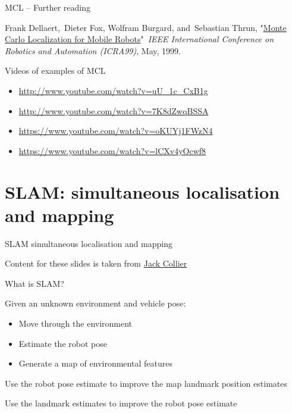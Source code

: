 \documentclass[compress]{beamer}
\begin{document}
\begin{frame}{MCL -- Further reading}

Frank Dellaert,~Dieter Fox, Wolfram Burgard, and~Sebastian Thrun,
"\href{http://www.ri.cmu.edu/publication_view.html?pub_id=533}{Monte
Carlo Localization for Mobile Robots}"~\emph{IEEE International
Conference on Robotics and Automation (ICRA99)}, May, 1999.

Videos of examples of MCL

\begin{itemize}
\item \url{http://www.youtube.com/watch?v=uU_1c_CxB1g}
\item \url{http://www.youtube.com/watch?v=7K8dZwqBSSA}
\item \url{https://www.youtube.com/watch?v=oKUYj1FWzN4}
\item \url{https://www.youtube.com/watch?v=lCXv4yOcwf8}
\end{itemize}

\end{frame}

\section{SLAM: simultaneous localisation and mapping}

\begin{frame}{SLAM simultaneous localisation and mapping}

Content for these slides is taken from
\href{http://www.computerrobotvision.org/2010/slam_camp.html}{Jack
Collier}

\end{frame}

\begin{frame}{What is SLAM?}

Given an unknown environment and vehicle pose:

\begin{itemize}
\item Move through the environment
\item Estimate the robot pose
\item Generate a map of environmental features
\end{itemize}

Use the robot pose estimate to improve the map landmark position
estimates

Use the landmark estimates to improve the robot pose estimate

\end{frame}
\end{document}
